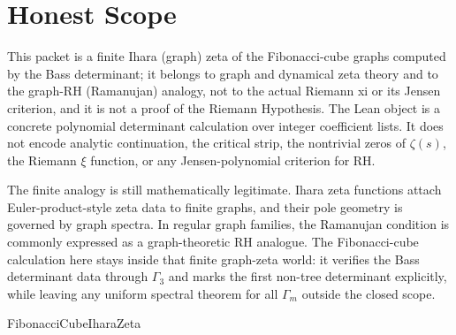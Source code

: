 \section{Honest Scope}
\label{sec:fibonacci-cube-ihara-honest-scope}

This packet is a finite Ihara (graph) zeta of the Fibonacci-cube graphs computed by the Bass determinant; it belongs to graph and dynamical zeta theory and to the graph-RH (Ramanujan) analogy, not to the actual Riemann xi or its Jensen criterion, and it is not a proof of the Riemann Hypothesis. The Lean object is a concrete polynomial determinant calculation over integer coefficient lists. It does not encode analytic continuation, the critical strip, the nontrivial zeros of $\zeta(s)$, the Riemann $\xi$ function, or any Jensen-polynomial criterion for RH.

The finite analogy is still mathematically legitimate. Ihara zeta functions attach Euler-product-style zeta data to finite graphs, and their pole geometry is governed by graph spectra. In regular graph families, the Ramanujan condition is commonly expressed as a graph-theoretic RH analogue. The Fibonacci-cube calculation here stays inside that finite graph-zeta world: it verifies the Bass determinant data through $\Gamma_3$ and marks the first non-tree determinant explicitly, while leaving any uniform spectral theorem for all $\Gamma_m$ outside the closed scope.



\begin{closurestatus}{FibonacciCubeIharaZeta}
  \theoryclosure{\scopedClosure}
  \formalstatus{\theoremCheckedV}
\end{closurestatus}
